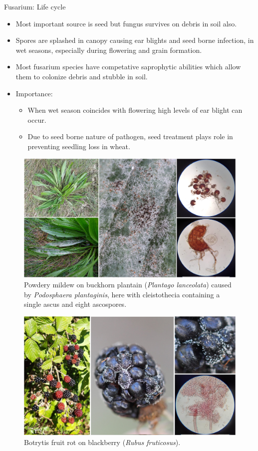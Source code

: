 \documentclass[10pt,dvipsnames,ignorenonframetext,aspectratio=169]{beamer}
\providecommand{\tightlist}{%
  \setlength{\itemsep}{0pt}\setlength{\parskip}{0pt}}
\begin{document}
\begin{frame}{Fusarium: Life cycle}
\protect\hypertarget{fusarium-life-cycle}{}
\begin{itemize}
\tightlist
\item
  Most important source is seed but fungus survives on debris in soil
  also.
\item
  Spores are splashed in canopy causing ear blights and seed borne
  infection, in wet seasons, especially during flowering and grain
  formation.
\item
  Most fusarium species have competative saprophytic abilities which
  allow them to colonize debris and stubble in soil.
\item
  Importance:

  \begin{itemize}
  \tightlist
  \item
    When wet season coincides with flowering high levels of ear blight
    can occur.
  \item
    Due to seed borne nature of pathogen, seed treatment plays role in
    preventing seedling loss in wheat.
  \end{itemize}
\end{itemize}
\end{frame}

\begin{frame}{}
\protect\hypertarget{section-9}{}
\begin{figure}
\includegraphics[width=0.38\linewidth]{../images/plantain_podosphaera_plantaginis_powdery_mildew} \caption{Powdery mildew on buckhorn plantain (\textit{Plantago lanceolata}) caused by \textit{Podosphaera plantaginis}, here with cleistothecia containing a single ascus and eight ascospores.}\label{fig:plantain-powdery-mildew}
\end{figure}

\begin{figure}
\includegraphics[width=0.38\linewidth]{../images/blackberry_botrytis_rot} \caption{Botrytis fruit rot on blackberry (\textit{Rubus fruticosus}).}\label{fig:blackberry-botrytis-rot}
\end{figure}
\end{frame}
\end{document}
